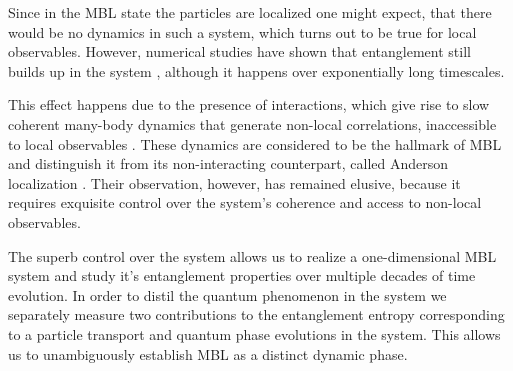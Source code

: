 Since in the MBL state the particles are localized one might expect, that there would be no dynamics in such a system, which turns out to be true for local observables. However, numerical studies have shown that entanglement still builds up in the system \cite{Znidaric2008, Bardarson2012}, although it happens over exponentially long timescales. 

This effect happens due to the presence of interactions, which give rise to slow coherent many-body dynamics that generate non-local correlations, inaccessible to local observables \cite{Serbyn2013, Serbyn2013a, Huse2014}. These dynamics are considered to be the hallmark of MBL and distinguish it from its non-interacting counterpart, called Anderson localization \cite{Anderson1958, Schwartz2007, Billy2008, Roati2008, Lahini2008, Kondov2011, Jendrzejewski2012, Semeghini2015}. Their observation, however, has remained elusive, because it requires exquisite control over the system's coherence and access to non-local observables.

The superb control over the system allows us to realize a one-dimensional MBL system and study it's entanglement properties over multiple decades of time evolution. In order to distil the quantum phenomenon in the system we separately measure two contributions to the entanglement entropy corresponding to a particle transport and quantum phase evolutions in the system. This allows us to unambiguously establish MBL as a distinct dynamic phase.